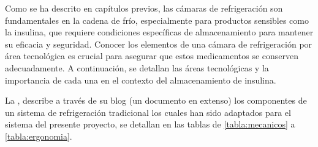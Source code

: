Como se ha descrito en capítulos previos, las cámaras de refrigeración son fundamentales en la cadena de frío, especialmente para productos sensibles como la insulina, que requiere condiciones específicas de almacenamiento para mantener su eficacia y seguridad. Conocer los elementos de una cámara de refrigeración por área tecnológica es crucial para asegurar que estos medicamentos se conserven adecuadamente. A continuación, se detallan las áreas tecnológicas y la importancia de cada una en el contexto del almacenamiento de insulina.
\newpage

La \cite{UG2022}, describe a través de su blog (un documento en extenso) los componentes de un sistema de refrigeración tradicional los cuales han sido adaptados para el sistema del presente proyecto, se detallan en las tablas de \ref{tabla:mecanicos} a \ref{tabla:ergonomia}.



